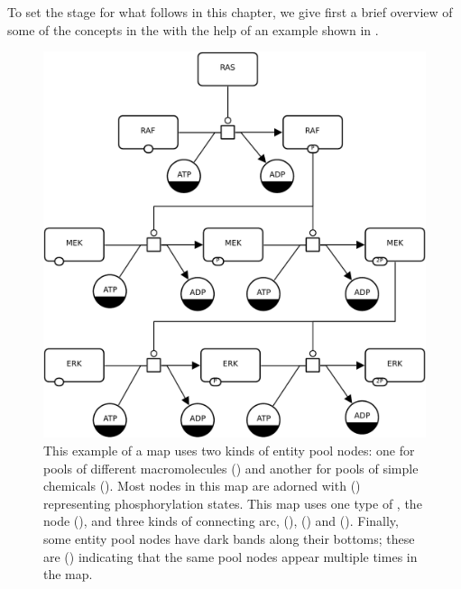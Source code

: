 
To set the stage for what follows in this chapter, we give first a brief overview of some of the concepts in the \PDl with the help of an example shown in .

\begin{figure}[H]
  \centering
  \includegraphics[scale=0.7]{images/build/MAPK_only_example.pdf}
  \caption{This example of a \PD map uses two kinds of entity pool nodes: one
    for pools of different macromolecules () and
    another for pools of simple chemicals ().  Most
     nodes in this map are adorned with  () representing phosphorylation states.
    This map uses one type of , the  node
    (), and three kinds of connecting arc,  (),  () and 
    ().  Finally, some entity pool nodes have dark bands
    along their bottoms; these are  () indicating that the same
    pool nodes appear multiple times in the map.}
  \label{fig:eg1}
\end{figure}

